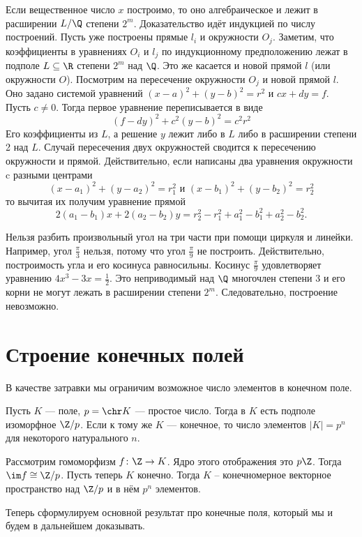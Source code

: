 \thrm Если вещественное число $x$ построимо, то оно алгебраическое и лежит в расширении $L/\Q$ степени $2^m$.
\proof Доказательство идёт индукцией по числу построений. Пусть уже построены прямые $l_i$ и окружности $O_j$. Заметим, что коэффициенты в уравнениях $O_i$ и $l_j$ по индукционному предположению лежат в подполе $L\subseteq \R$ степени $2^m$ над $\Q$. Это же касается и новой прямой $l$ (или окружности $O$). Посмотрим на пересечение окружности $O_j$ и новой прямой $l$. Оно задано системой уравнений $(x-a)^2+(y-b)^2=r^2$ и $cx+dy=f$. Пусть $c\neq 0$. Тогда первое уравнение переписывается в виде $$(f-dy)^2+c^2(y-b)^2=c^2r^2$$
Его коэффициенты из $L$, а решение $y$ лежит либо в $L$ либо в расширении степени 2 над $L$. Случай пересечения двух окружностей сводится к пересечению окружности и прямой.  Действительно, если написаны два уравнения окружности c разными центрами
$$(x-a_1)^2+(y-a_2)^2=r^2_1 \text{ и } (x-b_1)^2+(y-b_2)^2=r^2_2$$
то вычитая их получим уравнение прямой
$$2(a_1-b_1)x+2(a_2-b_2)y=r^2_2-r^2_1+a_1^2-b_1^2+a_2^2-b_2^2.$$

\endproof
\ethrm

\crl
Нельзя разбить произвольный угол на три части при помощи циркуля и линейки.
\proof Например, угол $\frac{\pi}{3}$ нельзя, потому что угол $\frac\pi 9$ не построить. Действительно, построимость угла и его косинуса равносильны. Косинус $\frac{\pi}{9}$ удовлетворяет уравнению $4x^3-3x=\frac{1}{2}$. Это неприводимый над $\Q$ многочлен степени 3 и его корни не могут лежать в расширении степени $2^m$. Следовательно, построение невозможно. 
\endproof
\ecrl

\section{Строение конечных полей}

В качестве затравки мы ограничим возможное число элементов в конечном поле.

\lm Пусть $K$ --- поле, $p=\chr K$ --- простое число. Тогда в $K$ есть подполе изоморфное $\Z/p$. Если к тому же $K$ --- конечное, то число элементов $|K|=p^n$ для некоторого натурального $n$. 
\elm


\proof Рассмотрим гомоморфизм $f\colon \Z \to K$. Ядро этого отображения это $p\Z$. Тогда $\im f\cong \Z/p$. Пусть теперь $K$ конечно. Тогда $K$ -- конечномерное векторное пространство над $\Z/p$ и в нём $p^n$ элементов.
\endproof
 
Теперь сформулируем основной результат про конечные поля, который мы и будем в дальнейшем доказывать.

